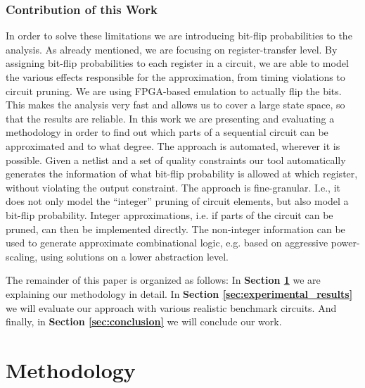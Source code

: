 \documentclass[10pt,twocolumn]{IEEEtran} %
\begin{document}
\subsubsection*{\bf{Contribution of this Work}}
In order to solve these limitations we are introducing bit-flip probabilities to the analysis. As already mentioned, we are focusing on register-transfer level. By assigning bit-flip probabilities to each register in a circuit, we are able to model the various effects responsible for the approximation, from timing violations to circuit pruning. We are using FPGA-based emulation to actually flip the bits. This makes the analysis very fast and allows us to cover a large state space, so that the results are reliable. In this work we are presenting and evaluating a methodology in order to find out which parts of a sequential circuit can be approximated and to what degree. The approach is automated, wherever it is possible. Given a netlist and a set of quality constraints our tool automatically generates the information of what bit-flip probability is allowed at which register, without violating the output constraint. The approach is fine-granular. I.e., it does not only model the ``integer'' pruning of circuit elements, but also model a bit-flip probability. Integer approximations, i.e. if parts of the circuit can be pruned, can then be implemented directly. The non-integer information can be used to generate approximate combinational logic, e.g. based on aggressive power-scaling, using solutions on a lower abstraction level.

The remainder of this paper is organized as follows: In {\bf Section \ref{sec:methodology}} we are explaining our methodology in detail. In {\bf Section \ref{sec:experimental_results}} we will evaluate our approach with various realistic benchmark circuits. And finally, in {\bf Section \ref{sec:conclusion}} we will conclude our work.



\section{\bf{Methodology}}
\label{sec:methodology}
\end{document}
